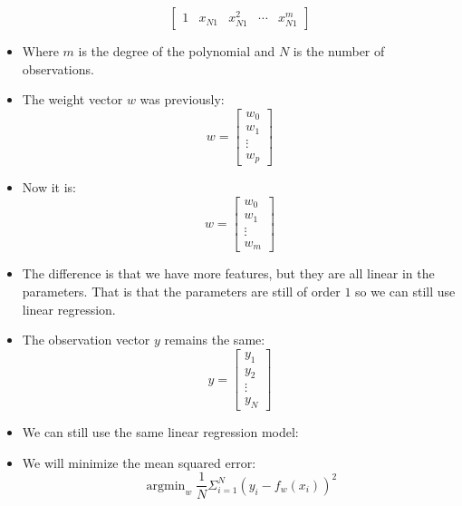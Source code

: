 \documentclass[12pt]{article}
\DeclareMathOperator*{\argmin}{argmin}
\begin{document}
\begin{itemize}
\begin{equation}
\begin{bmatrix}
                        1 & x_{N1} & x_{N1}^2 & \cdots & x_{N1}^m
                    \end{bmatrix}
                \end{equation}
                \item Where $m$ is the degree of the polynomial and $N$ is the number of observations.
                \item The weight vector $w$ was previously:
                \begin{equation}
                    w = \begin{bmatrix}
                        w_0 \\
                        w_1 \\
                        \vdots \\
                        w_p
                    \end{bmatrix}
                \end{equation}
                \item Now it is:
                \begin{equation}
                    w = \begin{bmatrix}
                        w_0 \\
                        w_1 \\
                        \vdots \\
                        w_m
                    \end{bmatrix}
                \end{equation}
                \item The difference is that we have more features, but they are all linear in the parameters. That is that the parameters are still of order $1$ so we can still use linear regression.
                \item The observation vector $y$ remains the same:
                \begin{equation}
                    y = \begin{bmatrix}
                        y_1 \\
                        y_2 \\
                        \vdots \\
                        y_N
                    \end{bmatrix}
                \end{equation}
                \item We can still use the same linear regression model:
                \item We will minimize the mean squared error:
                \begin{equation}
                    \argmin_w \frac{1}{N} \Sigma_{i=1}^N {(y_i - f_w(x_i))}^2
                \end{equation}
            \end{itemize}
\end{document}

